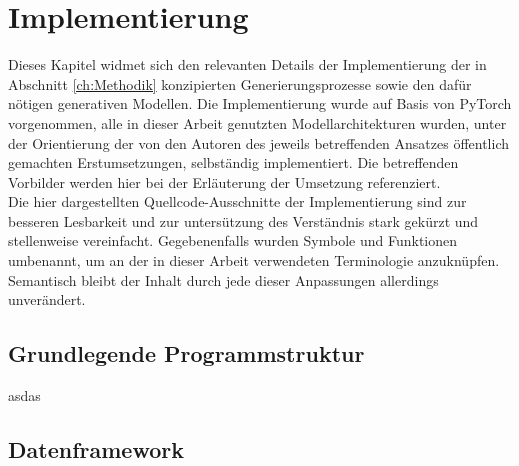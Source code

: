 \chapter{Implementierung}
\label{ch:Implementierung}

Dieses Kapitel widmet sich den relevanten Details der Implementierung der in Abschnitt \ref{ch:Methodik} konzipierten Generierungsprozesse sowie den dafür nötigen generativen Modellen. Die Implementierung wurde auf Basis von PyTorch vorgenommen, alle in dieser Arbeit genutzten Modellarchitekturen wurden, unter der Orientierung der von den Autoren des jeweils betreffenden Ansatzes öffentlich gemachten Erstumsetzungen, selbständig implementiert. Die betreffenden Vorbilder werden hier bei der Erläuterung der Umsetzung referenziert. \\
Die hier dargestellten Quellcode-Ausschnitte der Implementierung sind zur besseren Lesbarkeit und zur untersützung des Verständnis stark gekürzt und stellenweise vereinfacht. Gegebenenfalls wurden Symbole und Funktionen umbenannt, um an der in dieser Arbeit verwendeten Terminologie anzuknüpfen. Semantisch bleibt der Inhalt durch jede dieser Anpassungen allerdings unverändert.

\section {Grundlegende Programmstruktur}

asdas



\section {Datenframework}

